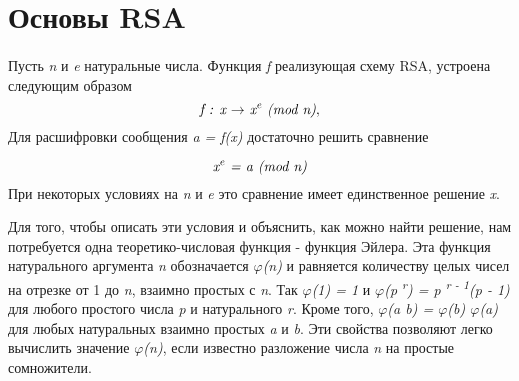 \section{Основы RSA}

\paragraph{} Пусть \textit{n} и \textit{e} натуральные числа. Функция \textit{f} реализующая схему RSA, устроена следующим образом
\begin{equation}
  \textit{f : x {$\rightarrow$} x\textsuperscript{e} (mod n)},
\end{equation}
Для расшифровки сообщения \textit{a = f(x)} достаточно решить сравнение 

\begin{equation}
  \textit{x\textsuperscript{e} = a (mod n)} 
\end{equation}
При некоторых условиях на \textit{n} и \textit{e} это сравнение имеет единственное решение \textit{x}.

  Для того, чтобы описать эти условия и объяснить, как можно найти решение, нам потребуется одна теоретико-числовая функция - функция Эйлера. 
Эта функция натурального аргумента \textit{n} обозначается \textit{{$\varphi$}(n)} и равняется количеству целых чисел на отрезке от 1 до \textit{n}, 
взаимно простых с \textit{n}. Так \textit{{$\varphi$}(1) = 1} и \textit{{$\varphi$}(p\textsuperscript{ r}) = p\textsuperscript{ r - 1}(p - 1)} 
для любого простого числа \textit{p} и натурального \textit{r}. Кроме того, \textit{{$\varphi$}(a b) = {$\varphi$}(b) {$\varphi$}(a)} 
для любых натуральных взаимно простых \textit{a} и \textit{b}. Эти свойства позволяют легко вычислить значение \textit{{$\varphi$}(n)}, если известно 
разложение числа \textit{n} на простые сомножители. 

